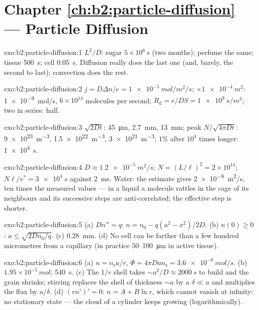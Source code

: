 \section*{Chapter \ref{ch:b2:particle-diffusion} --- Particle Diffusion}

\begin{solution}{exo:b2:particle-diffusion:1}
$L^2/D$: sugar $5 \times 10^6\,\unit{s}$ (two months); perfume the same;
tissue \qty{500}{s}; cell \qty{0.05}{s}. Diffusion really does the last
one (and, barely, the second to last); convection does the rest.
\end{solution}

\begin{solution}{exo:b2:particle-diffusion:2}
$j = D\Delta n/e = \qty{1e-5}{mol/m^2/s}$; $\times \qty{1e-4}{m^2}$:
\qty{1e-9}{mol/s}, $6 \times 10^{14}$ molecules per second;
$R_{\text{d}} = e/DS = \qty{1e9}{s/m^3}$; two in series: half.
\end{solution}

\begin{solution}{exo:b2:particle-diffusion:3}
$\sqrt{2Dt}$: \qty{45}{\micro m}, \qty{2.7}{mm}, \qty{13}{mm}; peak $N/\sqrt{4\pi
Dt}$: \qty{9e23}{m^{-3}}, \qty{1.5e22}{m^{-3}}, \qty{3e21}{m^{-3}}; $1\%$
after $10^4$ times longer: \qty{1e4}{s}.
\end{solution}

\begin{solution}{exo:b2:particle-diffusion:4}
$D \approx \qty{1.2e-5}{m^2/s}$; $N = (L/\ell)^2 = 2 \times 10^{14}$; $N\ell/v^*
= \qty{3e4}{s}$ against \qty{2}{ms}. Water: the estimate gives
\qty{2e-8}{m^2/s}, ten times the measured values --- in a liquid a
molecule rattles in the cage of its neighbours and its successive steps
are anti-correlated; the effective step is shorter.
\end{solution}

\begin{solution}{exo:b2:particle-diffusion:5}
(a) $Dn'' = q$: $n = n_0 - q(a^2 - x^2)/2D$. (b) $n(0) \ge 0$: $a \le
\sqrt{2Dn_0/q}$. (c) \qty{0.28}{mm}. (d) No cell can be farther than a
few hundred micrometres from a capillary (in practice $50$--\qty{100}{\micro m}
in active tissue).
\end{solution}

\begin{solution}{exo:b2:particle-diffusion:6}
(a) $n = n_{\text{s}}a/r$, $\Phi = 4\pi D a n_{\text{s}} = \qty{3.6e-8}{mol/s}$.
(b) $1.95 \times 10^{-5}\,\unit{mol}$; \qty{540}{s}. (c) The $1/r$ shell takes
$\sim a^2/D \approx \qty{2000}{s}$ to build and the grain shrinks; stirring
replaces the shell of thickness $\sim a$ by a  $\delta \ll a$
and multiplies the flux by $a/\delta$. (d) $(rn')' = 0$: $n = A + B\ln r$,
which cannot vanish at infinity: no stationary state --- the cloud of a
cylinder keeps growing (logarithmically).
\end{solution}


